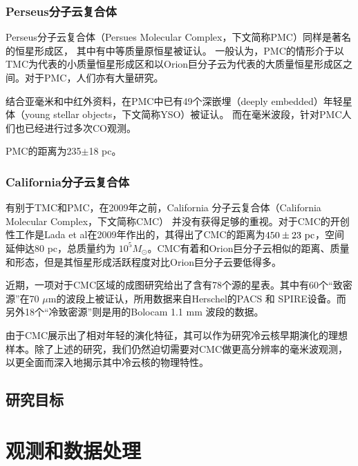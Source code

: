 \documentclass[UTF8]{pkuthss}
\begin{document}
		\subsection{Perseus分子云复合体}

			Perseus分子云复合体（Persues Molecular Complex，下文简称PMC）同样是著名的恒星形成区， 其中有中等质量原恒星被证认\supercite{2010A&A...512A..67L}。 一般认为，PMC的情形介于以TMC为代表的小质量恒星形成区和以Orion巨分子云为代表的大质量恒星形成区之间\supercite{2010ApJ...711..655J}。对于PMC，人们亦有大量研究。

			结合亚毫米和中红外资料，在PMC中已有49个深嵌埋（deeply embedded）年轻星体（young stellar objects，下文简称YSO）被证认\supercite{2007ApJ...656..293J}。 而在毫米波段，针对PMC人们也已经进行过多次CO观测\supercite{1979ApJ...233..163S,1999ApJ...525..318P, 2005A&A...440..151H}。

			PMC的距离为235$\pm$18 pc\supercite{2010A&A...512A..67L}。

		\subsection{California分子云复合体}

			有别于TMC和PMC，在2009年之前，California 分子云复合体（California Molecular Complex，下文简称CMC） 并没有获得足够的重视。对于CMC的开创性工作是Lada et al在2009年作出的，其得出了CMC的距离为$450\pm23\rm\ pc$，空间延伸达80 pc，总质量约为 $10^5 M_\odot$\supercite{2009ApJ...703...52L}。CMC有着和Orion巨分子云相似的距离、质量和形态，但是其恒星形成活跃程度对比Orion巨分子云要低得多\supercite{2009ApJ...703...52L,2010A&A...512A..67L}。

			近期，一项对于CMC区域的成图研究给出了含有78个源的星表\supercite{2013ApJ...764..133H}。其中有60个“致密源”在70 $\mu$m的波段上被证认，所用数据来自Herschel的PACS 和 SPIRE设备\supercite{2013ApJ...764..133H}。而另外18个“冷致密源”则是用的Bolocam 1.1 mm 波段的数据\supercite{2013ApJ...764..133H}。

			由于CMC展示出了相对年轻的演化特征，其可以作为研究冷云核早期演化的理想样本。除了上述的研究，我们仍然迫切需要对CMC做更高分辨率的毫米波观测，以更全面而深入地揭示其中冷云核的物理特性。

	\section{研究目标}
\chapter{观测和数据处理}
\end{document}
